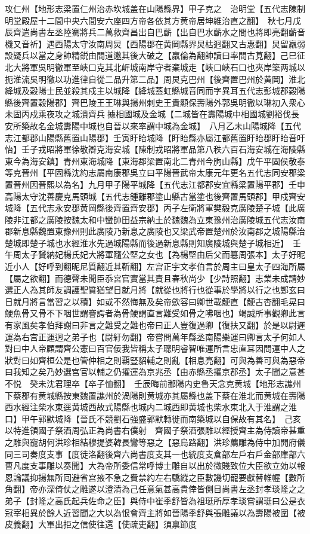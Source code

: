 攻仁州【地形志梁置仁州治赤坎城盖在山陽縣界】甲子克之　治明堂【五代志陳制明堂殿屋十二間中央六間安六座四方帝各依其方黄帝居坤維治直之翻】　秋七月戊辰齊遣尚書左丞陸騫將兵二萬救齊昌出自巴蘄【出自巴水蘄水之間也將即亮翻蘄音機又音祈】遇西陽太守汝南周炅【西陽郡在黄岡縣界炅枯迥翻又古惠翻】炅留羸弱設疑兵以當之身帥精鋭由間道邀其後大破之【羸倫為翻帥讀曰率間古莧翻】己巳征北大將軍吳明徹軍至峽口克其北㟁城南岸守者棄城走【峽口峽石口也夾岸築两城以扼淮流吳明徹以功進律自從二品升第二品】周炅克巴州【後齊置巴州於黄岡】淮北絳城及穀陽士民並殺其戍主以城降【絳城蓋虹縣城音同而字異耳五代志彭城郡穀陽縣後齊置穀陽郡】齊巴陵王王琳與揚州刺史王貴顯保壽陽外郭吳明徹以琳初入衆心未固丙戍乘夜攻之城潰齊兵據相國城及金城【二城皆在壽陽城中相國城劉裕伐長安所築故名金城夀陽中城也自晉以來率謂中城為金城】　八月乙未山陽城降【五代志江都郡山陽縣舊置山陽郡】壬寅盱眙城降【盱眙縣亦屬江都舊置盱眙郡盱眙音吁怡】壬子戎昭將軍徐敬辯克海安城【陳制戎昭將軍品第八秩六百石海安城在海陵縣東今為海安鎮】青州東海城降【東海郡梁置南北二青州今朐山縣】戊午平固侯敬泰等克晉州【平固縣沈約志屬南康郡吳立曰平陽晉武帝太康元年更名五代志同安郡梁置晉州因晉熙以為名】九月甲子陽平城降【五代志江都郡安宜縣梁置陽平郡】壬申高陽太守沈善慶克馬頭城【五代志鍾離郡塗山縣古當塗也後齊置馬頭郡】甲戍齊安城降【五代志永安郡黄岡縣後齊置齊安郡】丙子左衛將軍樊毅克廣陵楚子城【此廣陵非江都之廣陵按魏太和中蠻帥田益宗納土於魏魏為立東豫州治廣陵城五代志汝南郡新息縣魏置東豫州則此廣陵乃新息之廣陵也又梁武帝置楚州於汝南郡之城陽縣治楚城即楚子城也水經淮水先過城陽縣而後過新息縣則知廣陵城與楚子城相近】　壬午周太子贇納妃楊氏妃大將軍隨公堅之女也【為楊堅由后父而簒周張本】太子好昵近小人【好呼到翻昵尼質翻近其靳翻】左宫正宇文孝伯言於周主曰皇太子四海所屬【屬之欲翻】而德聲未聞臣忝宮官實當其責且春秋尚少【少詩照翻】志業未成請妙選正人為其師友調護聖質猶望日就月將【就從也將行也從事於學將以行之也鄭玄曰日就月將言當習之以積】如或不然悔無及矣帝歛容曰卿世載鯁直【鯁古杏翻毛晃曰鯁魚骨又骨不下咽世謂謇諤者為骨鯁謂直言難受如骨之咈咽也】竭誠所事觀卿此言有家風矣孝伯拜謝曰非言之難受之難也帝曰正人豈復過卿【復扶又翻】於是以尉遲運為右宫正運迥之弟子也【尉紆勿翻】帝嘗問萬年縣丞南陽樂運曰卿言太子何如人對曰中人帝顧謂齊公憲曰百官佞我皆稱太子聰明睿智唯運所言忠直耳因問運中人之狀對曰如齊桓公是也管仲相之則覇豎貂輔之則亂【相息亮翻】可與為善可與為惡帝曰我知之矣乃妙選宫官以輔之仍擢運為京兆丞【由赤縣丞擢京郡丞】太子聞之意甚不悦　癸未沈君理卒【卒子恤翻】　壬辰晦前鄱陽内史魯天念克黄城【地形志譙州下蔡郡有黄城縣按東魏置譙州於渦陽則黄城亦其屬縣也盖下蔡在淮北而黄城在壽陽西水經注柴水東逕黄城西故式陽縣也城内二城西即黄城也柴水東北入于淮謂之淮口】甲午郭默城降【晉氏不競劉石強盛郭默轉徙而南築城以自保故有其名】　己亥以特進領國子祭酒周弘正為尚書右僕射　齊國子祭酒張雕以經授齊主為侍讀帝甚重之雕與寵胡何洪珍相結穆提婆韓長鸞等惡之【惡烏路翻】洪珍薦雕為侍中加開府儀同三司奏度支事【度徒洛翻後齊六尚書度支其一也統度支倉部左戶右戶金部庫部六曹凡度支事雕以奏聞】大為帝所委信常呼博士雕自以出於微賤致位大臣欲立効以報恩論議抑揚無所囘避省宫掖不急之費禁約左右驕縱之臣數譏切寵要獻替帷幄【數所角翻】帝亦深倚仗之雕遂以澄清為己任意氣甚高貴倖皆側目尚書左丞封孝琰隆之之弟子【封隆之高氏起兵佐命之臣】與侍中崔季舒皆為祖珽所厚孝琰嘗謂珽曰公是衣冠宰相異於餘人近習聞之大以為恨會齊主將如晉陽季舒與張雕議以為壽陽被圍【被皮義翻】大軍出拒之信使往還【使疏吏翻】須禀節度